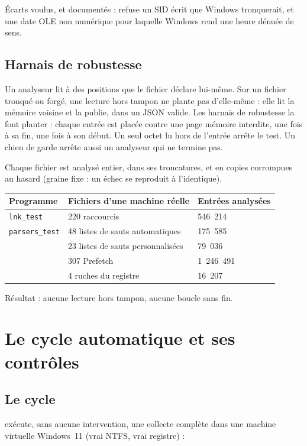 \documentclass[11pt,a4paper,oneside]{report}
\begin{document}
Écarts voulus, et documentés : \wac{} refuse un SID écrit que Windows
tronquerait, et une date OLE non numérique pour laquelle Windows rend une heure
dénuée de sens.

\section{Harnais de robustesse}

Un analyseur lit à des positions que le fichier déclare lui-même. Sur un
fichier tronqué ou forgé, une lecture hors tampon ne plante pas d'elle-même :
elle lit la mémoire voisine et la publie, dans un JSON valide. Les harnais de
robustesse la font planter : chaque entrée est placée contre une page mémoire
interdite, une fois à sa fin, une fois à son début. Un seul octet lu hors de
l'entrée arrête le test. Un chien de garde arrête aussi un analyseur qui ne
termine pas.

Chaque fichier est analysé entier, dans ses troncatures, et en copies
corrompues au hasard (graine fixe : un échec se reproduit à l'identique).

\begin{longtable}{@{}L{4.2cm}L{6.4cm}L{4.4cm}@{}}
\toprule
\textbf{Programme} & \textbf{Fichiers d'une machine réelle} & \textbf{Entrées analysées} \\
\midrule
\endhead
\texttt{lnk\_test} & 220 raccourcis & 546~214 \\
\texttt{parsers\_test} & 48 listes de sauts automatiques & 175~585 \\
 & 23 listes de sauts personnalisées & 79~036 \\
 & 307 Prefetch & 1~246~491 \\
 & 4 ruches du registre & 16~207 \\
\bottomrule
\end{longtable}

Résultat : aucune lecture hors tampon, aucune boucle sans fin.

\chapter{Le cycle automatique et ses contrôles}\label{ch:cycle}

\section{Le cycle}

 exécute, sans aucune intervention, une
collecte complète dans une machine virtuelle Windows~11 (vrai NTFS, vrai
registre) :
\end{document}
